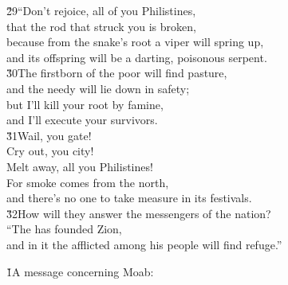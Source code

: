 \begin{poetry}
\poeml \v{29}``Don't rejoice, all of you Philistines, \\
\poemll    that the rod that struck you is broken, \\
\poeml because from the snake's root a viper will spring up, \\
\poemll    and its offspring will be a darting, poisonous serpent. \\
\poeml \v{30}The firstborn of the poor will find pasture, \\
\poemll    and the needy will lie down in safety; \\
\poeml but I'll kill your root by famine, \\
\poemll    and I'll execute your survivors. \\
\poeml \v{31}Wail, you gate! \\
\poemll    Cry out, you city! \\
\poemlll       Melt away, all you Philistines! \\
\poeml For smoke comes from the north, \\
\poemll    and there's no one to take measure in its festivals. \\
\poeml \v{32}How will they answer the messengers of the nation? \\
\poemll    ``The  has founded Zion, \\
\poemlll       and in it the afflicted among his people will find refuge.''
\end{poetry}

\v{1}A message concerning Moab:

